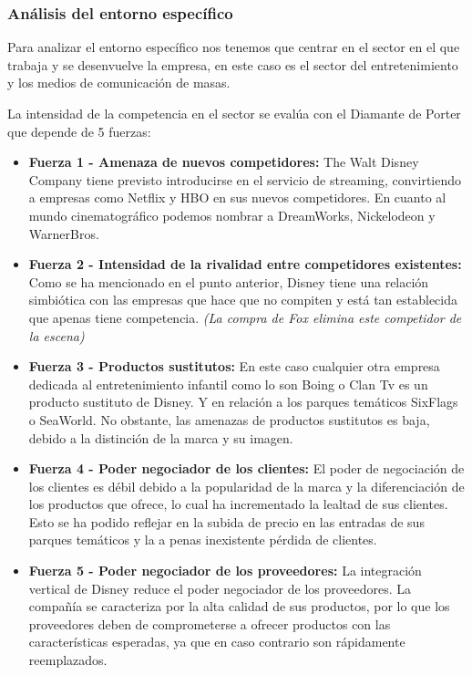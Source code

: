 \subsubsection{Análisis del entorno específico}
Para analizar el entorno específico nos tenemos que centrar en el sector en el que trabaja y se desenvuelve la empresa, en este caso es el sector del entretenimiento y los medios de comunicación de masas.

La intensidad de la competencia en el sector se evalúa con el Diamante de Porter que depende de 5 fuerzas:

\begin{itemize}

\item
\textbf{Fuerza 1 - Amenaza de nuevos competidores:} The Walt Disney Company tiene previsto introducirse en el servicio de streaming, convirtiendo a empresas como Netflix y HBO en sus nuevos competidores. En cuanto al mundo cinematográfico podemos nombrar a DreamWorks, Nickelodeon y WarnerBros.

\item
\textbf{Fuerza 2 - Intensidad de la rivalidad entre competidores existentes:} Como se ha mencionado en el punto anterior, Disney tiene una relación simbiótica con las empresas que hace que no compiten y está tan establecida que apenas tiene competencia. \textit{(La compra de Fox elimina este competidor de la escena)}

\item
\textbf{Fuerza 3 - Productos sustitutos:} En este caso cualquier otra empresa dedicada al entretenimiento infantil como lo son Boing o Clan Tv es un producto sustituto de Disney. Y en relación a los parques temáticos SixFlags o SeaWorld. No obstante, las amenazas de productos sustitutos es baja, debido a la distinción de la marca y su imagen.

\item
\textbf{Fuerza 4 - Poder negociador de los clientes:} El poder de negociación de los clientes es débil debido a la popularidad de la marca y la diferenciación de los productos que ofrece, lo cual ha incrementado la lealtad de sus clientes. Esto se ha podido reflejar en la subida de precio en las entradas de sus parques temáticos y la a penas inexistente pérdida de clientes.

\item
\textbf{Fuerza 5 - Poder negociador de los proveedores:} La integración vertical de Disney reduce el poder negociador de los proveedores. La compañía se caracteriza por la alta calidad de sus productos, por lo que los proveedores deben de comprometerse a ofrecer productos con las características esperadas, ya que en caso contrario son rápidamente reemplazados.

\end{itemize}